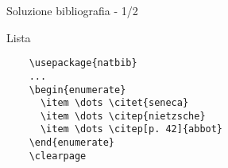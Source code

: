 \begin{frame}[fragile]{Soluzione bibliografia - 1/2}

\begin{block}{Lista}
    
\begin{lstlisting}
    \usepackage{natbib}
    ...
    \begin{enumerate}
      \item \dots \citet{seneca}
      \item \dots \citep{nietzsche}
      \item \dots \citep[p. 42]{abbot}
    \end{enumerate}
    \clearpage
    
    
\end{lstlisting}

\end{block}

\end{frame}
